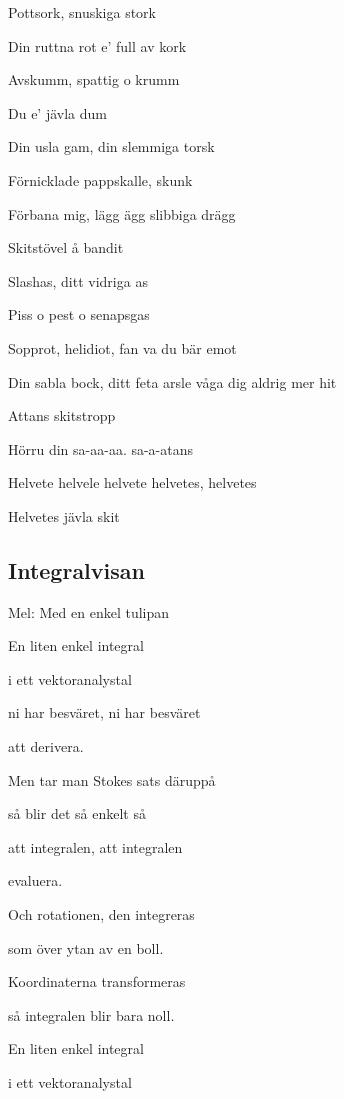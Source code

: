 Pottsork, snuskiga stork

Din ruttna rot e’ full av kork\bigskip



Avskumm, spattig o krumm

Du e’ jävla dum

Din usla gam, din slemmiga torsk

Förnicklade pappskalle, skunk \bigskip



Förbana mig, lägg ägg slibbiga drägg

Skitstövel å bandit

Slashas, ditt vidriga as

Piss o pest o senapsgas\bigskip



Sopprot, helidiot, fan va du bär emot

Din sabla bock, ditt feta arsle våga dig aldrig mer hit

Attans skitstropp\bigskip



Hörru din sa-aa-aa. sa-a-atans

Helvete helvele helvete helvetes, helvetes

Helvetes jävla skit\bigskip



\subsection{\textbf{Integralvisan}}

Mel: Med en enkel tulipan\bigskip

En liten enkel integral

i ett vektoranalystal

ni har besväret, ni har besväret

att derivera.

Men tar man Stokes sats däruppå

så blir det så enkelt så

att integralen, att integralen

evaluera.

Och rotationen, den integreras

som över ytan av en boll.

Koordinaterna transformeras

så integralen blir bara noll.

En liten enkel integral

i ett vektoranalystal

